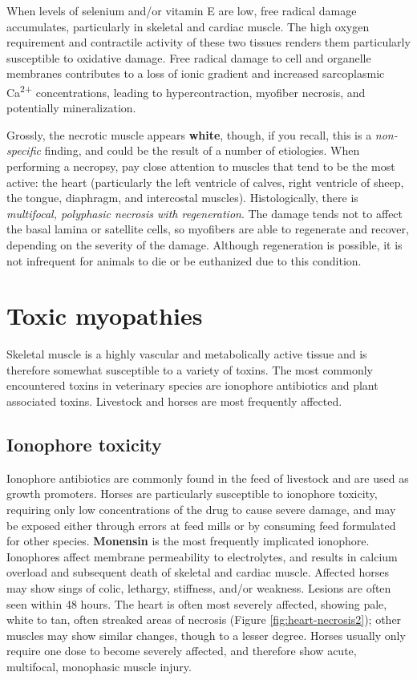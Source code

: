 \documentclass[openany]{book}
\begin{document}
When levels of selenium and/or vitamin E are low, free radical damage
accumulates, particularly in skeletal and cardiac muscle. The high
oxygen requirement and contractile activity of these two tissues renders
them particularly susceptible to oxidative damage. Free radical damage
to cell and organelle membranes contributes to a loss of ionic gradient
and increased sarcoplasmic Ca\textsuperscript{2+} concentrations,
leading to hypercontraction, myofiber necrosis, and potentially
mineralization.

Grossly, the necrotic muscle appears \textbf{white}, though, if you
recall, this is a \emph{non-specific} finding, and could be the result
of a number of etiologies. When performing a necropsy, pay close
attention to muscles that tend to be the most active: the heart
(particularly the left ventricle of calves, right ventricle of sheep,
the tongue, diaphragm, and intercostal muscles). Histologically, there
is \emph{multifocal, polyphasic necrosis with regeneration}. The damage
tends not to affect the basal lamina or satellite cells, so myofibers
are able to regenerate and recover, depending on the severity of the
damage. Although regeneration is possible, it is not infrequent for
animals to die or be euthanized due to this condition.

\chapter{Toxic myopathies}\label{toxic-myopathies}

Skeletal muscle is a highly vascular and metabolically active tissue and
is therefore somewhat susceptible to a variety of toxins. The most
commonly encountered toxins in veterinary species are ionophore
antibiotics and plant associated toxins. Livestock and horses are most
frequently affected.

\hypertarget{ionophore-toxicity}{\section{Ionophore
toxicity}\label{ionophore-toxicity}}

Ionophore antibiotics are commonly found in the feed of livestock and
are used as growth promoters. Horses are particularly susceptible to
ionophore toxicity, requiring only low concentrations of the drug to
cause severe damage, and may be exposed either through errors at feed
mills or by consuming feed formulated for other species.
\textbf{Monensin} is the most frequently implicated ionophore.
Ionophores affect membrane permeability to electrolytes, and results in
calcium overload and subsequent death of skeletal and cardiac muscle.
Affected horses may show sings of colic, lethargy, stiffness, and/or
weakness. Lesions are often seen within 48 hours. The heart is often
most severely affected, showing pale, white to tan, often streaked areas
of necrosis (Figure \ref{fig:heart-necrosis2}); other muscles may show
similar changes, though to a lesser degree. Horses usually only require
one dose to become severely affected, and therefore show acute,
multifocal, monophasic muscle injury.
\end{document}
